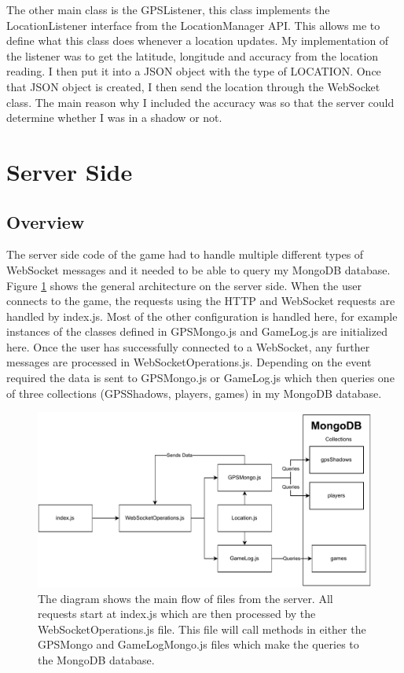 \documentclass{l4proj}
\begin{document}
The other main class is the GPSListener, this class implements the LocationListener interface from the LocationManager
API. This allows me to define what this class does whenever a location updates. My implementation of the listener was
to get the latitude, longitude and accuracy from the location reading. I then put it into a JSON object with the type
of LOCATION. Once that JSON object is created, I then send the location through the WebSocket class. The main reason why
I included the accuracy was so that the server could determine whether I was in a shadow or not.


\section{Server Side}
\label{serverside_imp}

\subsection{Overview}
\label{serverOverview}
The server side code of the game had to handle multiple different types of WebSocket messages and it needed
to be able to query my MongoDB database. Figure \ref{fig:serverSideOverview} shows the general architecture
on the server side. When the user connects to the game, the requests using the HTTP and WebSocket requests
are handled by index.js. Most of the other configuration is handled here, for example instances of the classes
defined in GPSMongo.js and GameLog.js are initialized here. Once the user has successfully connected to a WebSocket,
any further messages are processed in WebSocketOperations.js. Depending on the event required the data is sent
to GPSMongo.js or GameLog.js which then queries one of three collections (GPSShadows, players, games) in my MongoDB database.

\begin{figure}
    \centering
    \includegraphics[width=\linewidth]{images/serverSideOverview.pdf}    

    \caption{
        The diagram shows the main flow of files from the server. All requests start at index.js which are
        then processed by the WebSocketOperations.js file. This file will call methods in either the GPSMongo
        and GameLogMongo.js files which make the queries to the MongoDB database.  
    }

    \label{fig:serverSideOverview} 
\end{figure}
\end{document}

